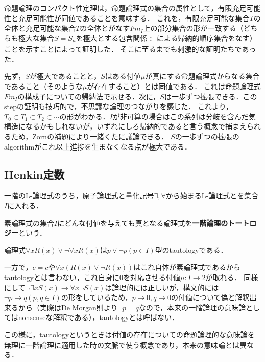 \documentclass[uplatex, 12pt, dvipdfmx]{jsreport}
\begin{document}
\begin{screen}
    命題論理のコンパクト性定理は，命題論理式の集合の属性として，有限充足可能性と充足可能性が同値であることを意味する．
    これを，有限充足可能な集合$T$の全体と充足可能な集合$T$の全体とがなす$Fm_I$上の部分集合の形が一致する（どちらも極大な集合$S=S_\mu$を極大とする包含関係$\subset$による帰納的順序集合をなす）ことを示すことによって証明した．
    そこに至るまでも刺激的な証明たちであった．
    
    先ず，$S$が極大であることと，$S$はある付値$\mu$が真にする命題論理式からなる集合であること（そのような$\mu$が存在すること）とは同値である．
    これは命題論理式$Fm_I$の構成子についての帰納法で示せる．次に，$S$は一歩ずつ拡張できる．このstepの証明も技巧的で，不思議な論理のつながりを感じた．
    これより，$T_0\subset T_1\subset T_2\subset\cdots$の形がわかる．$I$が非可算の場合はこの系列は分岐を含んだ気構造になるかもしれないが，いずれにしろ帰納的であると言う概念で捕まえられるため，Zornの補題により一緒くたに議論できる．
    $S$の一歩ずつの拡張のalgorithmがこれ以上進捗を生まなくなる点が極大である．
\end{screen}

\subsection{Henkin定数}

\begin{definition}[一階論理の命題論理への翻訳]\label{def-interpretation-first-to-zero}
    一階のL-論理式のうち，原子論理式と量化記号$\exists,\forall$から始まるL-論理式とを集合$I$に入れる．
\end{definition}

\begin{definition}
    素論理式の集合$I$にどんな付値を与えても真となる論理式を\textbf{一階論理のトートロジー}という．
\end{definition}
\begin{example}[一階論理では恒真であることとtautologyであることにはズレがある]
    論理式$\forall xR(x)\lor\lnot\forall xR(x)$は$p\lor\lnot p(p\in I)$型のtautologyである．

    一方で，$c=c$や$\forall x(R(x)\lor\lnot R(x))$はこれ自体が素論理式であるからtautologyとは言わない，これ自身に$0$を対応させる付値$\mu:I\to 2$が取れる．
    同様にして$\lnot\exists xS(x)\to\forall x\lnot S(x)$は論理的には正しいが，構文的には$\lnot p\to q(p,q\in I)$の形をしているため，$p\mapsto 0,q\mapsto 0$の付値について偽と解釈出来るから（実際はDe Morgan則より$\lnot p =q$なので，本来の一階論理の意味論としてはnonsenseな解釈である），tautologyとは呼ばない．

    この様に，tautologyというときは付値の存在についての命題論理的な意味論を無理に一階論理に適用した時の文脈で使う概念であり，本来の意味論とは異なる．
\end{example}
\end{document}
